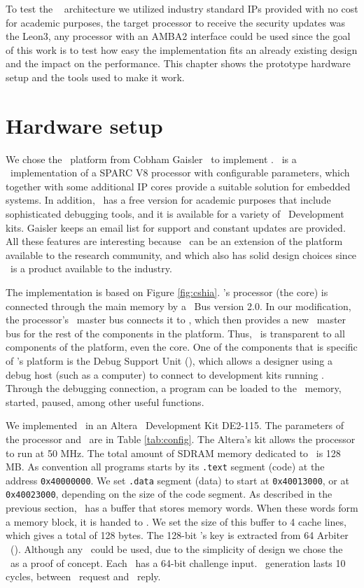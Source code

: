To test the \cshia~ architecture  we utilized industry standard IPs provided with no cost for academic purposes, the target processor to receive the security updates was the Leon3, any processor with an AMBA2 interface  could be used since the goal of this work is to test how easy the implementation fits an already existing design and  the impact on the performance. This chapter shows the prototype hardware setup and the tools used to make it work.

\section{Hardware setup}
\label{sec:hardware_setup}

We chose the \leon~platform from Cobham Gaisler~\cite{Leon} to implement \cshia. \leon~is a \vhdl~implementation of a SPARC V8 processor with configurable parameters, which together with some additional IP cores provide a suitable solution for embedded systems. In addition, \leon~has a free version for academic purposes that include sophisticated debugging tools, and it is available for a variety of \fpga~Development kits. Gaisler keeps an email list for support and constant updates are provided. All these features are interesting because \cshia~can be an extension of the platform available to the research community, and which also has solid design choices since \leon~is a product available to the industry.

The implementation is based on Figure \ref{fig:cshia}. \leon's processor (the core) is connected through the main memory by a \amba~Bus version 2.0. In our modification, the processor's \io~master bus connects it to \handler, which then provides a new \io~master bus for the rest of the components in the platform. Thus, \handler~is transparent to all components of the platform, even the core. One of the components that is specific of \leon's platform is the Debug Support Unit (\dsu), which allows a designer using a debug host (such as a computer) to connect to development kits running \leon. Through the debugging connection, a program can be loaded to the \fpga~memory, started, paused, among other useful functions.

We implemented \cshia~in an Altera \fpga~Development Kit DE2-115. The parameters of the processor and \cshia~are in Table \ref{tab:config}. The Altera's kit allows the processor to run at 50 MHz. The total amount of SDRAM memory dedicated to \leon~is 128 MB. As convention all programs starts by its \texttt{.text} segment (code) at the address \texttt{0x40000000}. We set \texttt{.data} segment (data) to start at \texttt{0x40013000}, or at \texttt{0x40023000}, depending on the size of the code segment. As described in the previous section, \handler~has a buffer that stores memory words. When these words form a memory block, it is handed to \seceng. We set the size of this buffer to 4 cache lines, which gives a total of 128 bytes. The 128-bit \siphash's key is extracted from 64 Arbiter \pufs~(\apufs). Although any \puf~could be used, due to the simplicity of design we chose the \apuf~as a proof of concept. Each \apuf~has a 64-bit challenge input. \ptag~generation lasts 10 cycles, between \seceng~request and \ptaggen~reply.

